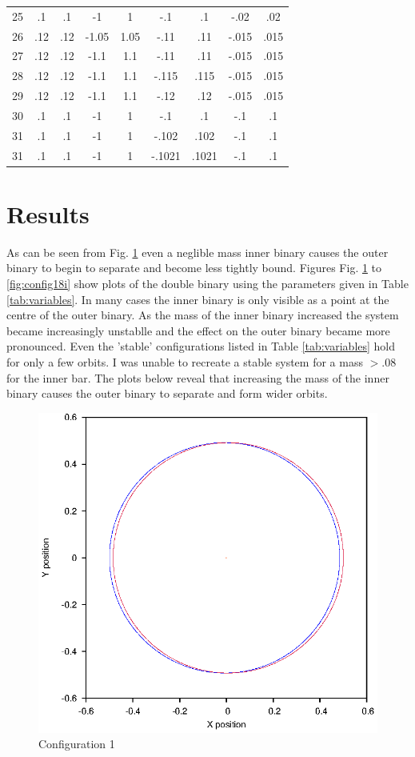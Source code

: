 \documentclass[a4paper,12pt]{article}
\begin{document}
\begin{table}[ht!]
\begin{tabular}{ccccccccc}
   25 & .1 & .1 & -1 & 1 & -.1 & .1 & -.02 & .02\\
   26 & .12 & .12 & -1.05 & 1.05 & -.11 & .11 & -.015 & .015\\
   27 & .12 & .12 & -1.1 & 1.1 & -.11 & .11 & -.015 & .015\\
   28 & .12 & .12 & -1.1 & 1.1 & -.115 & .115 & -.015 & .015\\
   29 & .12 & .12 & -1.1 & 1.1 & -.12 & .12 & -.015 & .015\\
   30 & .1 & .1 & -1 & 1 & -.1 & .1 & -.1 & .1\\
   31 & .1 & .1 & -1 & 1 & -.102 & .102 & -.1 & .1\\
   31 & .1 & .1 & -1 & 1 & -.1021 & .1021 & -.1 & .1\\
  \end{tabular}
\end{table}

\section{Results}
As can be seen from Fig. \ref{fig:config1} even a neglible mass inner binary causes the outer binary to begin to separate and become less tightly bound.
Figures Fig. \ref{fig:config1} to \ref{fig:config18i} show plots of the double binary using the parameters given in Table \ref{tab:variables}.
In many cases the inner binary is only visible as a point at the centre of the outer binary.
As the mass of the inner binary increased the system became increasingly unstablle and the effect on the outer binary became more pronounced.
Even the 'stable' configurations listed in Table \ref{tab:variables} hold for only a few orbits.
I was unable to recreate a stable system for a mass $>.08$ for the inner bar.
The plots below reveal that increasing the mass of the inner binary causes the outer binary to separate and
form wider orbits.

\begin{figure}[H]
\centering
\includegraphics[width=.9\textwidth]{./2016results/stablebase/Orbit.eps}
\caption{Configuration 1}
\label{fig:config1}
\end{figure}
\end{document}
